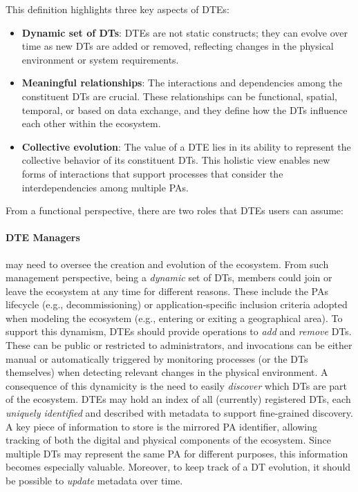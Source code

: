 This definition highlights three key aspects of \aclp{DTE}:
\begin{itemize}
    \item \textbf{Dynamic set of \aclp{DT}}: \acp{DTE} are not static constructs; they can evolve over time as new \acp{DT} are added or removed, reflecting changes in the physical environment or system requirements.
    
    \item \textbf{Meaningful relationships}: The interactions and dependencies among the constituent \acp{DT} are crucial. These relationships can be functional, spatial, temporal, or based on data exchange, and they define how the \acp{DT} influence each other within the ecosystem.
    
    \item \textbf{Collective evolution}: The value of a \ac{DTE} lies in its ability to represent the collective behavior of its constituent \acp{DT}. This holistic view enables new forms of interactions that support processes that consider the interdependencies among multiple \acp{PA}.
\end{itemize}

From a functional perspective, there are two roles that \acp{DTE} users can assume: 

\paragraph{\ac{DTE} Managers} may need to oversee the creation and evolution of the ecosystem. 
%
From such management perspective, 
being a \emph{dynamic} set of \acp{DT}, members could join or leave the ecosystem at any time for different reasons.
These include the \acp{PA} lifecycle (e.g., decommissioning) or application-specific inclusion criteria adopted when modeling the ecosystem (e.g., entering or exiting a geographical area).
%
To support this dynamism, \acp{DTE} should provide operations to \emph{add} and \emph{remove} \acp{DT}.
These can be public or restricted to administrators, and invocations can be either manual or automatically triggered by monitoring processes (or the \acp{DT} themselves) when detecting relevant changes in the physical environment.
%
A consequence of this dynamicity is the need to easily \emph{discover} which \acp{DT} are part of the ecosystem.
\acp{DTE} may hold an index of all (currently) registered \acp{DT}, each \emph{uniquely identified} and described with metadata to support fine-grained discovery.
%
A key piece of information to store is the mirrored \ac{PA} identifier, allowing tracking of both the digital and physical components of the ecosystem.
Since multiple \acp{DT} may represent the same \ac{PA} for different purposes, this information becomes especially valuable.
Moreover, to keep track of a \ac{DT} evolution, it should be possible to \emph{update} metadata over time.


